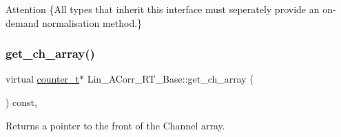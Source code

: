 \begin{DoxyAttention}{Attention}
\{All types that inherit this interface must seperately provide an on-\/demand normalisation method.\} 
\end{DoxyAttention}
\mbox{\label{group__Lin__ACorr__Base__Out_gafb6585805776a54d5e4f120cfd1fea9e}} 
\subsubsection{\texorpdfstring{get\+\_\+ch\+\_\+array()}{get\_ch\_array()}}
{\footnotesize\ttfamily virtual \hyperlink{types_8hpp_ac89ac912f524b3e3fa3720ea55fec966}{counter\+\_\+t}$\ast$ Lin\+\_\+\+A\+Corr\+\_\+\+R\+T\+\_\+\+Base\+::get\+\_\+ch\+\_\+array (\begin{DoxyParamCaption}{ }\end{DoxyParamCaption}) const\hspace{0.3cm}{\ttfamily [inline]}, {}}

Returns a pointer to the front of the Channel array. 